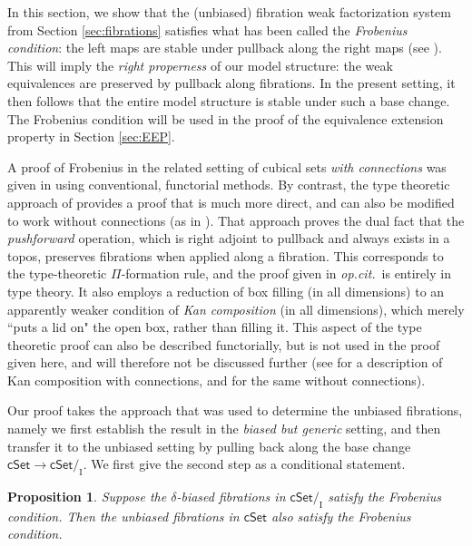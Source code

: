 \documentclass[11pt,reqno]{amsart}
\newcommand{\opcit}{\emph{op.cit.}}
\newcommand{\cSet}{\ensuremath{\mathsf{cSet}}}
\renewcommand{\to}{\ensuremath{\rightarrow}}
\newcommand{\I}{\ensuremath{\mathrm{I}}}
\newtheorem{proposition}[theorem]{Proposition}
\theoremstyle{remark}
\theoremstyle{definition}
\begin{document}
In this section, we show that the (unbiased) fibration weak factorization system from Section \ref{sec:fibrations} satisfies what has been called the \emph{Frobenius condition}: the left maps are stable under pullback along the right maps (see \cite{van-den-berg-garner}).  This will imply the \emph{right properness} of our model structure: the weak equivalences are preserved by pullback along fibrations.  In the present setting, it then follows that the entire model structure is stable under such a base change.  The Frobenius condition will be used in the proof of the equivalence extension property in Section \ref{sec:EEP}.  

A proof of Frobenius in the related setting of cubical sets \emph{with connections} was given in \cite{GS} using conventional, functorial methods.  By contrast, the type theoretic approach of \cite{CCHM:2018ctt} provides a proof that is much more direct, and can also be modified to work without connections (as in \cite{ABCHFL}).  That approach proves the dual fact that the \emph{pushforward} operation, which is right adjoint to pullback and always exists in a topos, preserves fibrations when applied along a fibration.  This corresponds to the type-theoretic $\Pi$-formation rule, and the proof given in \opcit\ is entirely in type theory.  It also employs a reduction of box filling (in all dimensions) to an apparently weaker condition of \emph{Kan composition} (in all dimensions), which merely ``puts a lid on" the open box, rather than filling it.  This aspect of the type theoretic proof can also be described functorially, but is not used in the proof given here, and will therefore not be discussed further (see \cite{LOPS18} for a description of Kan composition with connections, and \cite{A:composiiton} for the same without connections).

Our proof takes the approach that was used to determine the unbiased fibrations, namely we first establish the result in the \emph{biased but generic} setting, and then transfer it to the unbiased setting by pulling back along the base change $\cSet\to\cSet/_\I$. We first give the second step as a conditional statement.

\begin{proposition}\label{prop:biasedFrobimpliesunbiasedFrob}
Suppose the $\delta$-biased fibrations in $\cSet/_\I$ satisfy the Frobenius condition. Then the unbiased fibrations in $\cSet$ also satisfy the Frobenius condition.
\end{proposition}
\end{document}
